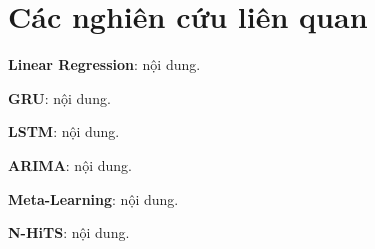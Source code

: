 \section{Các nghiên cứu liên quan}
\textbf{Linear Regression}: nội dung.
\par
\textbf{GRU}: nội dung.
\par
\textbf{LSTM}: nội dung.
\par
\textbf{ARIMA}: nội dung.
\par
\textbf{Meta-Learning}: nội dung.
\par
\textbf{N-HiTS}: nội dung.